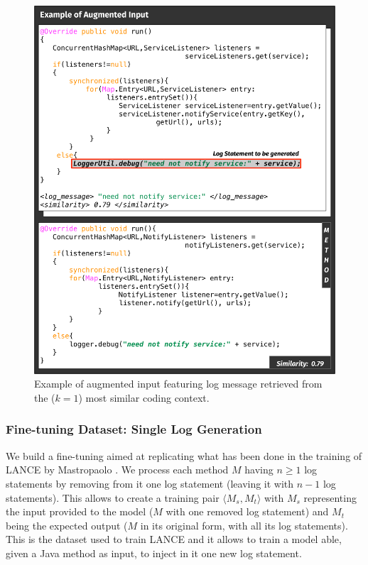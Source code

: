 \begin{figure}[h!]
	\label{fig:ir-example}
	\includegraphics[width=\columnwidth]{img/ir-example.pdf}
	\caption{Example of augmented input featuring log message retrieved from the ($k=1$) most similar coding context.}
\end{figure}




\subsubsection{Fine-tuning Dataset: Single Log Generation} \label{sec:single-log-dataset}
We build a fine-tuning aimed at replicating what has been done in the training of LANCE by Mastropaolo \etal \cite{mastropaolo2022using}. We process each method $M$ having $n \geq 1$ log statements by removing from it one log statement (\ie leaving it with $n-1$ log statements). This allows to create a training pair $\langle M_s, M_t \rangle$ with $M_s$ representing the input provided to the model (\ie $M$ with one removed log statement) and  $M_t$ being the expected output (\ie $M$ in its original form, with all its log statements). This is the dataset used to train LANCE \cite{mastropaolo2022using} and it allows to train a model able, given a Java method as input, to inject in it one new log statement. 

